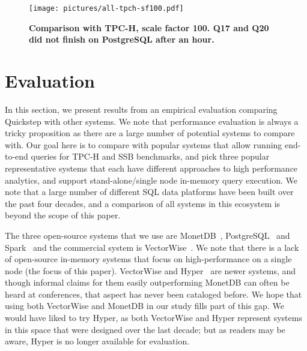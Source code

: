 
\begin{figure*}[htb]
\center
\texttt{[image: pictures/all-tpch-sf100.pdf]}
\caption{\textbf{Comparison with TPC-H, scale factor 100. Q17 and Q20 did not finish on PostgreSQL after an hour.}} %
\label{fig-tpch-sf100}
\end{figure*}

\section{Evaluation} \label{evaluation}
In this section, we present results from an empirical evaluation comparing Quickstep with other systems. We note that performance evaluation is always a tricky proposition as there are a large number of potential systems to compare with. Our goal here is to compare with popular systems that allow running end-to-end queries for TPC-H and SSB benchmarks, and pick three popular representative systems that each have different approaches to high performance analytics, and support stand-alone/single node in-memory query execution. We note that a large number of different SQL data platforms have been built over the past four decades, and a comparison of all systems in this ecosystem is beyond the scope of this paper.


The three open-source systems that we use are MonetDB~\cite{monetdb}, PostgreSQL~\cite{postgres} and Spark~\cite{Spark, SparkSQL} and the commercial system is VectorWise~\cite{vectorwise}. We note that there is a lack of open-source in-memory systems that focus on high-performance on a single node (the focus of this paper). VectorWise and Hyper~\cite{hyper} are newer systems, and though informal claims for them easily outperforming MonetDB can often be heard at conferences, that aspect has never been cataloged before. We hope that using both VectorWise  and MonetDB in our study fills part of this gap. We would have liked to try Hyper, as both VectorWise and Hyper represent systems in this space that were designed over the last decade; but as readers may be aware, Hyper is no longer available for evaluation.

